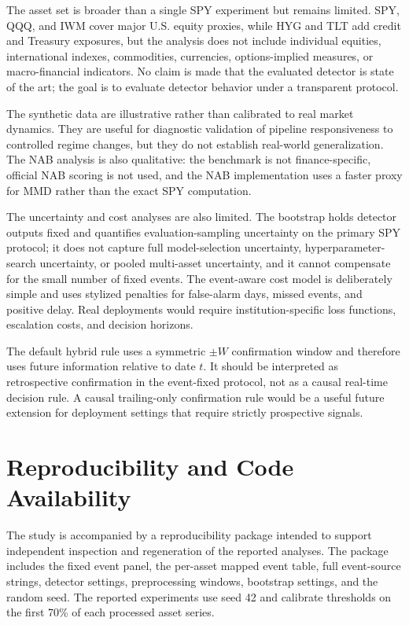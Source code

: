 \documentclass[pdflatex,sn-mathphys-num]{sn-jnl}
\begin{document}
The asset set is broader than a single SPY experiment but remains limited. SPY, QQQ, and IWM cover major U.S. equity proxies, while HYG and TLT add credit and Treasury exposures, but the analysis does not include individual equities, international indexes, commodities, currencies, options-implied measures, or macro-financial indicators. No claim is made that the evaluated detector is state of the art; the goal is to evaluate detector behavior under a transparent protocol.

The synthetic data are illustrative rather than calibrated to real market dynamics. They are useful for diagnostic validation of pipeline responsiveness to controlled regime changes, but they do not establish real-world generalization. The NAB analysis is also qualitative: the benchmark is not finance-specific, official NAB scoring is not used, and the NAB implementation uses a faster proxy for MMD rather than the exact SPY computation.

The uncertainty and cost analyses are also limited. The bootstrap holds detector outputs fixed and quantifies evaluation-sampling uncertainty on the primary SPY protocol; it does not capture full model-selection uncertainty, hyperparameter-search uncertainty, or pooled multi-asset uncertainty, and it cannot compensate for the small number of fixed events. The event-aware cost model is deliberately simple and uses stylized penalties for false-alarm days, missed events, and positive delay. Real deployments would require institution-specific loss functions, escalation costs, and decision horizons.

The default hybrid rule uses a symmetric $\pm W$ confirmation window and therefore uses future information relative to date $t$. It should be interpreted as retrospective confirmation in the event-fixed protocol, not as a causal real-time decision rule. A causal trailing-only confirmation rule would be a useful future extension for deployment settings that require strictly prospective signals.

\section{Reproducibility and Code Availability}
The study is accompanied by a reproducibility package intended to support independent inspection and regeneration of the reported analyses. The package includes the fixed event panel, the per-asset mapped event table, full event-source strings, detector settings, preprocessing windows, bootstrap settings, and the random seed. The reported experiments use seed 42 and calibrate thresholds on the first 70\% of each processed asset series.
\end{document}
